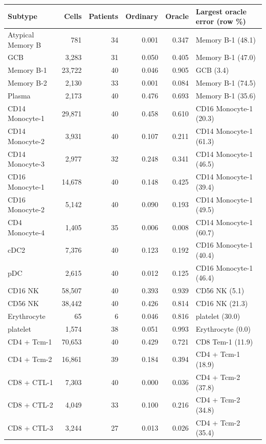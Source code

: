 \begin{table}[H]
\centering\small
\setlength{\tabcolsep}{3pt}
\begin{tabular}{lrrr r l}
\toprule
Subtype & Cells & Patients & Ordinary & Oracle & Largest oracle error (row \%) \\
\midrule
Atypical Memory B & 781 & 34 & 0.001 & 0.347 & Memory B-1 (48.1) \\
GCB & 3,283 & 31 & 0.050 & 0.405 & Memory B-1 (47.0) \\
Memory B-1 & 23,722 & 40 & 0.046 & 0.905 & GCB (3.4) \\
Memory B-2 & 2,130 & 33 & 0.001 & 0.084 & Memory B-1 (74.5) \\
Plasma & 2,173 & 40 & 0.476 & 0.693 & Memory B-1 (35.6) \\
\midrule
CD14 Monocyte-1 & 29,871 & 40 & 0.458 & 0.610 & CD16 Monocyte-1 (20.3) \\
CD14 Monocyte-2 & 3,931 & 40 & 0.107 & 0.211 & CD14 Monocyte-1 (61.3) \\
CD14 Monocyte-3 & 2,977 & 32 & 0.248 & 0.341 & CD14 Monocyte-1 (46.5) \\
CD16 Monocyte-1 & 14,678 & 40 & 0.148 & 0.425 & CD14 Monocyte-1 (39.4) \\
CD16 Monocyte-2 & 5,142 & 40 & 0.090 & 0.193 & CD14 Monocyte-1 (49.5) \\
CD4 Monocyte-4 & 1,405 & 35 & 0.006 & 0.008 & CD14 Monocyte-1 (60.7) \\
cDC2 & 7,376 & 40 & 0.123 & 0.192 & CD16 Monocyte-1 (40.4) \\
pDC & 2,615 & 40 & 0.012 & 0.125 & CD16 Monocyte-1 (46.4) \\
\midrule
CD16 NK & 58,507 & 40 & 0.393 & 0.939 & CD56 NK (5.1) \\
CD56 NK & 38,442 & 40 & 0.426 & 0.814 & CD16 NK (21.3) \\
\midrule
Erythrocyte & 65 & 6 & 0.046 & 0.816 & platelet (30.0) \\
platelet & 1,574 & 38 & 0.051 & 0.993 & Erythrocyte (0.0) \\
\midrule
CD4 + Tcm-1 & 70,653 & 40 & 0.429 & 0.721 & CD8 Tem-1 (11.9) \\
CD4 + Tcm-2 & 16,861 & 39 & 0.184 & 0.394 & CD4 + Tcm-1 (18.9) \\
CD8 + CTL-1 & 7,303 & 40 & 0.000 & 0.036 & CD4 + Tcm-2 (37.8) \\
CD8 + CTL-2 & 4,049 & 33 & 0.100 & 0.216 & CD4 + Tcm-2 (34.8) \\
CD8 + CTL-3 & 3,244 & 27 & 0.013 & 0.026 & CD4 + Tcm-2 (35.4) \\

\end{tabular}
\end{table}
